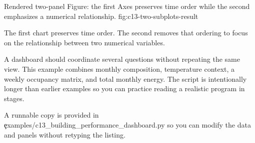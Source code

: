 {Rendered two-panel Figure: the first Axes preserves time order while the second emphasizes a numerical relationship.}
{fig:c13-two-subplots-result}

The first chart preserves time order. The second removes that ordering to focus
on the relationship between two numerical variables.

\label{sec:c13-dashboard}

A dashboard should coordinate several questions without repeating the same
view. This example combines monthly composition, temperature context, a weekly
occupancy matrix, and total monthly energy. The script is intentionally longer
than earlier examples so you can practice reading a realistic program in
stages.

A runnable copy is provided in
\c{examples/c13_building_performance_dashboard.py} so you can modify the data
and panels without retyping the listing.

